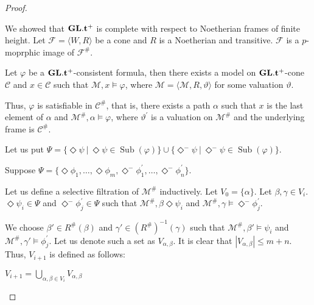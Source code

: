 \documentclass[a4paper]{article}
\theoremstyle{defin}
\theoremstyle{theorem}
\theoremstyle{prop}
\theoremstyle{lemma}
\theoremstyle{ex}
\theoremstyle{col}
\newcommand{\DiamondM}{\Diamond^{-}}
\begin{document}
\begin{proof}
  $ $


We showed that ${\bf GL}.{\bf t}^{+}$ is complete with respect to Noetherian frames of finite height. Let $\mathcal{F} = \langle W, R \rangle$ be a cone and $R$ is a Noetherian and transitive. $\mathcal{F}$ is a $p$-moprphic image of $\mathcal{F}^{\#}$.

Let $\varphi$ be a ${\bf GL}.{\bf t}^{+}$-consistent formula, then there exists a model on ${\bf GL}.{\bf t}^{+}$-cone $\mathcal{C}$ and $x \in \mathcal{C}$ such that $\mathcal{M}, x \models \varphi$, where $\mathcal{M} = \langle \mathcal{M}, R, \vartheta \rangle$ for some valuation $\vartheta$.

Thus, $\varphi$ is satisfiable in $\mathcal{C}^{\#}$, that is, there exists a path $\alpha$ such that $x$ is the last element of $\alpha$ and $\mathcal{M}^{\#}, \alpha \models \varphi$, where $\vartheta^{'}$ is a valuation on $\mathcal{M}^{\#}$ and the underlying frame is $\mathcal{C}^{\#}$.

Let us put $\Psi = \{ \Diamond \psi \: | \: \Diamond \psi \in \operatorname{Sub}(\varphi)\} \cup \{ \DiamondM \psi \: | \: \DiamondM \psi \in \operatorname{Sub}(\varphi)\}$.

Suppose $\Psi = \{ \Diamond \phi_1, \dots, \Diamond \phi_m, \DiamondM \phi^{'}_1, \dots, \DiamondM \phi^{'}_n \}$.

Let us define a selective filtration of $\mathcal{M}^{\#}$ inductively. Let $V_0 = \{ \alpha \}$. Let $\beta, \gamma \in V_i$. $\Diamond \psi_i \in \Psi$ and $\DiamondM \phi^{'}_j \in \Psi$ such that $\mathcal{M}^{\#}, \beta \Diamond \psi_i$ and $\mathcal{M}^{\#}, \gamma \models \DiamondM \phi^{'}_j$.

We choose $\beta' \in R^{\#}(\beta)$ and $\gamma' \in (R^{\#})^{-1}(\gamma)$ such that $\mathcal{M}^{\#}, \beta' \models \psi_i$ and
$\mathcal{M}^{\#}, \gamma' \models \phi^{'}_j$. Let us denote such a set as $V_{\alpha, \beta}$. It is clear that $|V_{\alpha, \beta}| \leq m + n$. Thus, $V_{i+1}$ is defined as follows:

\begin{center}
    $V_{i+1} = \bigcup \limits_{\alpha, \beta \in V_i} V_{\alpha, \beta}$
\end{center}
\end{proof}



\end{document}
